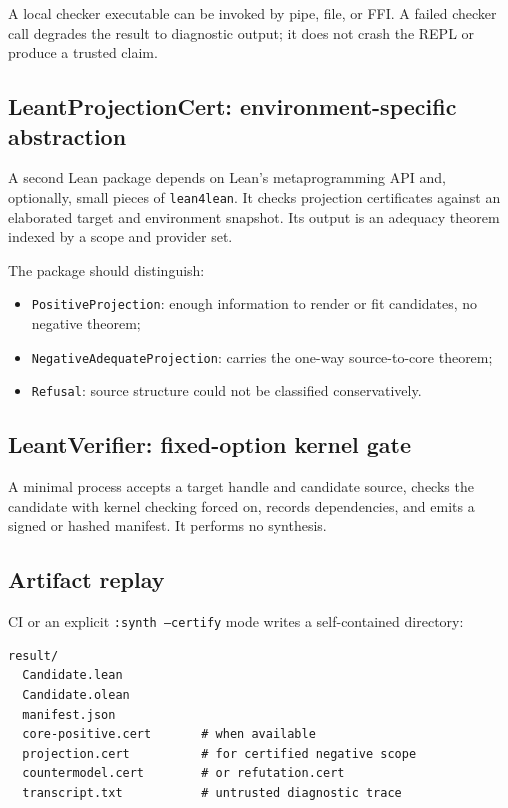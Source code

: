 \documentclass[11pt,letterpaper,openany]{report}
\theoremstyle{definition}
\theoremstyle{remark}
\newcommand{\code}[1]{\texttt{#1}}
\begin{document}
A local checker executable can be invoked by pipe, file, or FFI. A failed checker call degrades the result to diagnostic output; it does not crash the REPL or produce a trusted claim.

\subsection{LeantProjectionCert: environment-specific abstraction}

A second Lean package depends on Lean's metaprogramming API and, optionally, small pieces of \code{lean4lean}. It checks projection certificates against an elaborated target and environment snapshot. Its output is an adequacy theorem indexed by a scope and provider set.

The package should distinguish:

\begin{itemize}
\item \code{PositiveProjection}: enough information to render or fit candidates, no negative theorem;
\item \code{NegativeAdequateProjection}: carries the one-way source-to-core theorem;
\item \code{Refusal}: source structure could not be classified conservatively.
\end{itemize}

\subsection{LeantVerifier: fixed-option kernel gate}

A minimal process accepts a target handle and candidate source, checks the candidate with kernel checking forced on, records dependencies, and emits a signed or hashed manifest. It performs no synthesis.

\subsection{Artifact replay}

CI or an explicit \code{:synth --certify} mode writes a self-contained directory:

\begin{lstlisting}[caption={Proposed artifact bundle.}]
result/
  Candidate.lean
  Candidate.olean
  manifest.json
  core-positive.cert       # when available
  projection.cert          # for certified negative scope
  countermodel.cert        # or refutation.cert
  transcript.txt           # untrusted diagnostic trace
\end{lstlisting}
\end{document}
